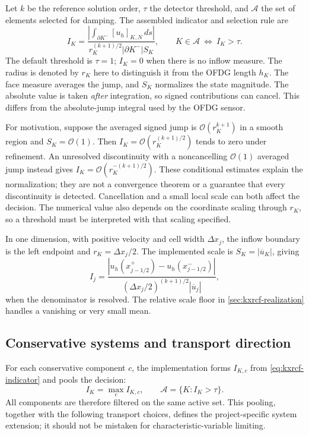 Let $k$ be the reference solution order, $\tau$ the detector threshold,
and $\mathcal A$ the set of elements selected for damping. The assembled
indicator and selection rule are
\begin{equation}
 I_K=\frac{\left|\displaystyle\int_{\partial K^-}
                  [u_h]_{K,N}\,ds\right|}
                 {r_K^{(k+1)/2}|\partial K^-|S_K},
 \qquad K\in\mathcal A\ \Longleftrightarrow\ I_K>\tau.
 \label{eq:kxrcf-indicator}
\end{equation}
The default threshold is $\tau=1$; $I_K=0$ when there is no inflow measure.
The radius is denoted by $r_K$ here to distinguish it from the OFDG length
$h_K$. The face measure averages the jump, and $S_K$ normalizes the state
magnitude. The absolute value is taken \emph{after} integration, so signed
contributions can cancel. This differs from the absolute-jump integral used
by the OFDG sensor.

For motivation, suppose the averaged signed jump is
$\mathcal O(r_K^{k+1})$ in a smooth region and $S_K=\mathcal O(1)$.
Then $I_K=\mathcal O(r_K^{(k+1)/2})$ tends to zero under refinement.
An unresolved discontinuity with a noncancelling $\mathcal O(1)$ averaged jump
instead gives $I_K=\mathcal O(r_K^{-(k+1)/2})$. These conditional estimates
explain the normalization; they are not a convergence theorem or a guarantee
that every discontinuity is detected. Cancellation and a small local scale
can both affect the decision. The numerical value also depends on the
coordinate scaling through $r_K$, so a threshold must be interpreted with
that scaling specified.

In one dimension, with positive velocity and cell width $\Delta x_j$, the
inflow boundary is the left endpoint and $r_K=\Delta x_j/2$. The implemented
scale is $S_K=|\overline u_K|$, giving
\begin{equation}
 I_j=\frac{|u_h(x_{j-1/2}^{+})-u_h(x_{j-1/2}^{-})|}
                 {(\Delta x_j/2)^{(k+1)/2}|\overline u_j|},
 \label{eq:kxrcf-1d}
\end{equation}
when the denominator is resolved. The relative scale floor in \cref{sec:kxrcf-realization} handles a
vanishing or very small mean.

\subsection{Conservative systems and transport direction}
\label{sec:kxrcf-transport}
For each conservative component $c$, the implementation forms $I_{K,c}$ from
\cref{eq:kxrcf-indicator} and pools the decision:
\begin{equation}
 I_K=\max_c I_{K,c},\qquad
 \mathcal A=\{K:I_K>\tau\}.
 \label{eq:kxrcf-components}
\end{equation}
All components are therefore filtered on the same active set. This pooling,
together with the following transport choices, defines the project-specific
system extension; it should not be mistaken for characteristic-variable
limiting.


